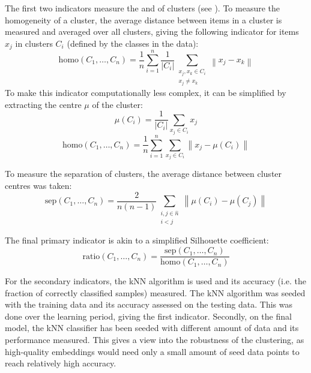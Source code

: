 The first two indicators measure the  and  of clusters (see \cite{everitt_cluster_2001}). To measure the homogeneity of a cluster, the average distance between items in a cluster is measured and averaged over all clusters, giving the following indicator for items \( x_j \) in clusters \( C_i \) (defined by the classes in the data):
\[ \mathrm{homo} \left( C_1, \dots, C_n \right) = \frac{1}{n} \sum_{i = 1}^n \frac{1}{\left\lvert C_i \right\rvert} \sum_{\substack{x_j, x_k \in C_i \\ x_j \neq x_k}} \left\lVert x_j - x_k \right\rVert \]
To make this indicator computationally less complex, it can be simplified by extracting the centre \( \mu \) of the cluster:
\[ \mu \left( C_i \right) = \frac{1}{\left\lvert C_i \right\rvert} \sum_{x_j \in C_i} x_j \]
\[ \mathrm{homo} \left( C_1, \dots, C_n \right) = \frac{1}{n} \sum_{i = 1}^n \sum_{x_j \in C_i} \left\lVert x_j - \mu \left( C_i \right) \right\rVert \]

To measure the separation of clusters, the average distance between cluster centres was taken:
\[ \mathrm{sep} \left( C_1, \dots, C_n \right) = \frac{2}{n \left( n - 1 \right)} \sum_{\substack{i, j \in \hat{n} \\ i < j }} \left\lVert \mu \left( C_i \right) - \mu \left( C_j \right) \right\rVert \]

The final primary indicator is akin to a simplified Silhouette coefficient:
\[ \mathrm{ratio} \left( C_1, \dots, C_n \right) = \frac{\mathrm{sep} \left( C_1, \dots, C_n \right)}{\mathrm{homo} \left( C_1, \dots, C_n \right)} \]

For the secondary indicators, the kNN algorithm is used and its accuracy (i.e. the fraction of correctly classified samples) measured. The kNN algorithm was seeded with the training data and its accuracy assessed on the testing data. This was done over the learning period, giving the first indicator. Secondly, on the final model, the kNN classifier has been seeded with different amount of data and its performance measured. This gives a view into the robustness of the clustering, as high-quality embeddings would need only a small amount of seed data points to reach relatively high accuracy.

